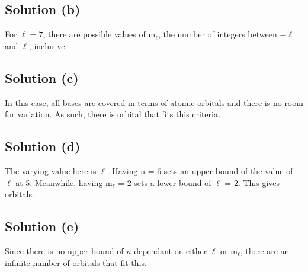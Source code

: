 \documentclass[10pt]{article}
\newcommand{\U}[1]{\underline{#1}}
\begin{document}
        \subsection{Solution (b)}
            For $\ell = 7$, there are  possible values of m$_\ell$, the number of integers between $-\ell$ and $\ell$, inclusive.
        
        \subsection{Solution (c)}
            In this case, all bases are covered in terms of atomic orbitals and there is no room for variation.
            As such, there is  orbital that fits this criteria.
        
        \subsection{Solution (d)}
            The varying value here is $\ell$.
            Having n = 6 sets an upper bound of the value of $\ell$ at 5.
            Meanwhile, having m$_\ell$ = 2 sets a lower bound of $\ell$ = 2.
            This gives  orbitals.
        
        \subsection{Solution (e)}
            Since there is no upper bound of $n$ dependant on either $\ell$ or m$_\ell$, there are an \U{infinite} number of orbitals that fit this.

    \pagebreak
    \tableofcontents
\end{document}
